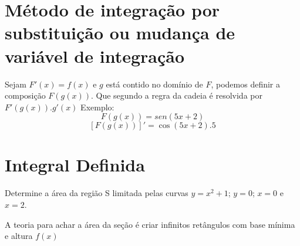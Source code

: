 \documentclass{article}
\begin{document}
	\section{Método de integração por substituição ou mudança de variável de integração}
		Sejam $F'(x)=f(x)$ e $g$ está contido no domínio de $F$, podemos definir a composição $F(g(x))$. Que segundo a regra da cadeia é resolvida por $F'(g(x)).g'(x)$
		Exemplo:
			$$F(g(x)) = sen(5x+2)$$
			$$[F(g(x))]' = \cos (5x+2).5$$
	\section{Integral Definida}
		Determine a área da região S limitada pelas curvas $y = x^2+1$; $y= 0$; $x=0$ e $x=2$.
		\begin{center}
		\end{center}
		A teoria para achar a área da seção é criar infinitos retângulos com base mínima e altura $f(x)$
\end{document}

